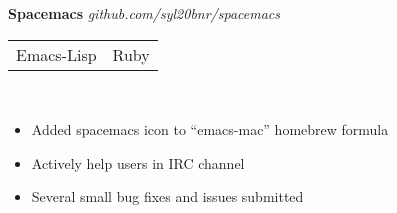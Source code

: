 \documentclass[margin,line,12pt]{res}
\begin{document}
{\begin{resume}


{\bf Spacemacs} {\em github.com/syl20bnr/spacemacs}  \
\\
\begin{tabular}{l l}
  Emacs-Lisp & Ruby
\end{tabular}
\\
\vspace{-.16in}
\begin{itemize}
  \item Added spacemacs icon to ``emacs-mac'' homebrew formula
  \item Actively help users in IRC channel
  \item Several small bug fixes and issues submitted
\end{itemize}
\vspace{0.08in}


\end{resume}}
\end{document}
